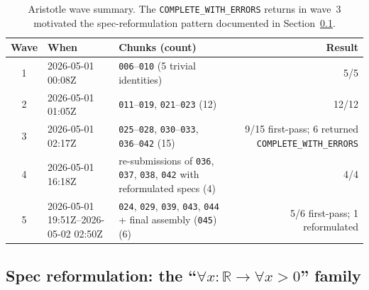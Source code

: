 \documentclass[11pt,a4paper]{article}
\theoremstyle{plain}
\theoremstyle{definition}
\newcommand{\R}{\mathbb{R}}
\begin{document}
\begin{table}[h]
\centering
\small
\begin{tabular}{@{}clp{}r@{}}
\toprule
\textbf{Wave} & \textbf{When} & \textbf{Chunks (count)} & \textbf{Result}\\
\midrule
1 & 2026-05-01 00:08Z & \texttt{006}--\texttt{010} (5 trivial identities) & 5/5\\
2 & 2026-05-01 01:05Z & \texttt{011}--\texttt{019}, \texttt{021}--\texttt{023} (12) & 12/12\\
3 & 2026-05-01 02:17Z & \texttt{025}--\texttt{028}, \texttt{030}--\texttt{033}, \texttt{036}--\texttt{042} (15) & 9/15 first-pass; 6 returned \texttt{COMPLETE\_WITH\_ERRORS}\\
4 & 2026-05-01 16:18Z & re-submissions of \texttt{036}, \texttt{037}, \texttt{038}, \texttt{042} with reformulated specs (4) & 4/4\\
5 & 2026-05-01 19:51Z--2026-05-02 02:50Z & \texttt{024}, \texttt{029}, \texttt{039}, \texttt{043}, \texttt{044} + final assembly (\texttt{045}) (6) & 5/6 first-pass; 1 reformulated\\
\bottomrule
\end{tabular}
\caption{Aristotle wave summary.  The \texttt{COMPLETE\_WITH\_ERRORS}
returns in wave~3 motivated the spec-reformulation pattern documented in
Section~\ref{sec:reform}.}
\label{tab:waves}
\end{table}

\subsection{Spec reformulation: the ``$\forall x:\R\to\forall x>0$'' family}\label{sec:reform}
\end{document}
